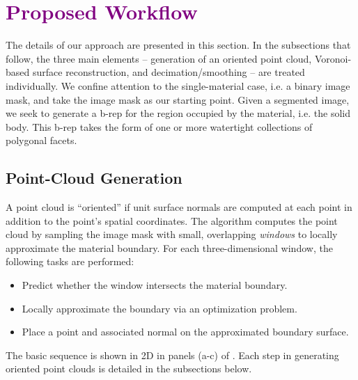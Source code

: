 \section{\textcolor{purple}{Proposed Workflow}}

The details of our approach are presented in this section.  In the subsections that follow, the three main elements -- generation of an oriented point cloud, Voronoi-based surface reconstruction, and decimation/smoothing -- are treated individually.  We confine attention to the single-material case, i.e. a binary image mask, and take the image mask as our starting point.  Given a segmented image, we seek to generate a b-rep for the region occupied by the material, i.e. the solid body.  This b-rep takes the form of one or more watertight collections of polygonal facets.

\subsection{Point-Cloud Generation}
\label{Point Cloud Generation}

A point cloud is ``oriented'' if unit surface normals are computed at each point in addition to the point's spatial coordinates. The algorithm computes the point cloud by sampling the image mask with small, overlapping \textit{windows} to locally approximate the material boundary. For each three-dimensional window, the following tasks are performed:
\vspace{2mm}
\begin{itemize}[noitemsep]
  \item Predict whether the window intersects the material boundary.
  \item Locally approximate the boundary via an optimization problem. 
  \item Place a point and associated normal on the approximated boundary surface.
\end{itemize}
\vspace{2mm}
The basic sequence is shown in 2D in panels (a-c) of . Each step in generating oriented point clouds is detailed in the subsections below.

